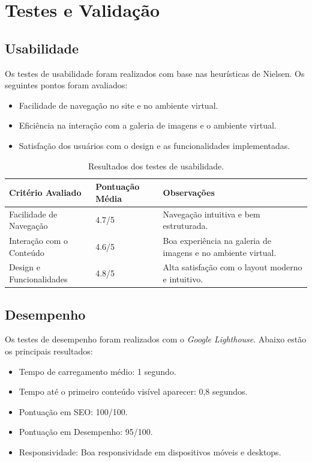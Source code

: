 \section{Testes e Validação}

\subsection{Usabilidade}
Os testes de usabilidade foram realizados com base nas heurísticas de Nielsen. Os seguintes pontos foram avaliados:
\begin{itemize}
    \item Facilidade de navegação no site e no ambiente virtual.
    \item Eficiência na interação com a galeria de imagens e o ambiente virtual.
    \item Satisfação dos usuários com o design e as funcionalidades implementadas.
\end{itemize}


\begin{table}[H]
\centering
\caption{Resultados dos testes de usabilidade.}
\label{tab:usabilidade}
\begin{tabularx}{\textwidth}{|l|X|X|} %
\hline
\textbf{Critério Avaliado} & \textbf{Pontuação Média} & \textbf{Observações} \\ \hline
Facilidade de Navegação    & 4.7/5                   & Navegação intuitiva e bem estruturada. \\ \hline
Interação com o Conteúdo    & 4.6/5                   & Boa experiência na galeria de imagens e no ambiente virtual. \\ \hline
Design e Funcionalidades    & 4.8/5                   & Alta satisfação com o layout moderno e intuitivo. \\ \hline
\end{tabularx}
\end{table}

\subsection{Desempenho}
Os testes de desempenho foram realizados com o \textit{Google Lighthouse}. Abaixo estão os principais resultados:
\begin{itemize}
    \item Tempo de carregamento médio: 1 segundo.
    \item Tempo até o primeiro conteúdo visível aparecer: 0,8 segundos.
    \item Pontuação em SEO: 100/100.
    \item Pontuação em Desempenho: 95/100.
    \item Responsividade: Boa responsividade em dispositivos móveis e desktops.
\end{itemize}

